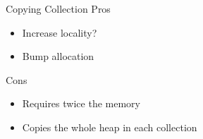 \documentclass[
14pt,
aspectratio=169,
usenames,
dvipsnames,
x11names]{beamer}
\newcommand{\tik}[0]{{\color{green}\Checkmark}} %
\newcommand{\ex}[0]{{\color{red}\XSolidBrush}}  %
\begin{document}
\begin{frame}{Copying Collection}
  Pros \tik
  \begin{itemize}  \setlength{\itemsep}{\fill}
  \item \alert{Increase locality?}
  \item \alert{Bump} allocation
  \end{itemize}

  \pause

  Cons \ex
  \begin{itemize}  \setlength{\itemsep}{\fill}
  \item Requires \alert{twice the memory}
  \item \alert{Copies the whole heap} in each collection
  \end{itemize}
\end{frame}


\end{document}
